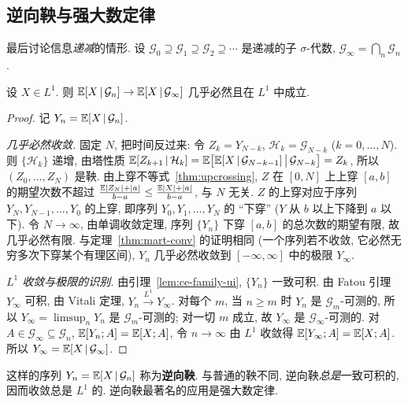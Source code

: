 \subsection{逆向鞅与强大数定律}

最后讨论信息\emph{递减}的情形. 设 $\mathcal{G}_0\supseteq\mathcal{G}_1\supseteq\mathcal{G}_2\supseteq\cdots$ 是递减的子 $\sigma$-代数, $\mathcal{G}_\infty=\bigcap_n\mathcal{G}_n$.

\begin{theorem}\label{thm:levy-down}
设 $X\in L^1$. 则 $\mathbb{E}[X\,|\,\mathcal{G}_n]\to\mathbb{E}[X\,|\,\mathcal{G}_\infty]$ 几乎必然且在 $L^1$ 中成立.
\end{theorem}

\begin{proof}
记 $Y_n=\mathbb{E}[X\,|\,\mathcal{G}_n]$.

\emph{几乎必然收敛.} 固定 $N$, 把时间反过来: 令 $Z_k=Y_{N-k}$, $\mathcal{H}_k=\mathcal{G}_{N-k}$ ($k=0,\dots,N$). 则 $\{\mathcal{H}_k\}$ 递增, 由塔性质 $\mathbb{E}[Z_{k+1}\,|\,\mathcal{H}_k]=\mathbb{E}\big[\mathbb{E}[X\,|\,\mathcal{G}_{N-k-1}]\,\big|\,\mathcal{G}_{N-k}\big]=Z_k$, 所以 $(Z_0,\dots,Z_N)$ 是鞅. 由上穿不等式~\ref{thm:upcrossing}, $Z$ 在 $[0,N]$ 上上穿 $[a,b]$ 的期望次数不超过 $\frac{\mathbb{E}\lvert Z_N\rvert+\lvert a\rvert}{b-a}\le\frac{\mathbb{E}\lvert X\rvert+\lvert a\rvert}{b-a}$, 与 $N$ 无关. $Z$ 的上穿对应于序列 $Y_N,Y_{N-1},\dots,Y_0$ 的上穿, 即序列 $Y_0,Y_1,\dots,Y_N$ 的 ``下穿'' ($Y$ 从 $b$ 以上下降到 $a$ 以下). 令 $N\to\infty$, 由单调收敛定理, 序列 $\{Y_n\}$ 下穿 $[a,b]$ 的总次数的期望有限, 故几乎必然有限. 与定理~\ref{thm:mart-conv} 的证明相同 (一个序列若不收敛, 它必然无穷多次下穿某个有理区间), $Y_n$ 几乎必然收敛到 $[-\infty,\infty]$ 中的极限 $Y_\infty$.

\emph{$L^1$ 收敛与极限的识别.} 由引理~\ref{lem:ce-family-ui}, $\{Y_n\}$ 一致可积. 由 Fatou 引理 $Y_\infty$ 可积, 由 Vitali 定理, $Y_n\xrightarrow{L^1}Y_\infty$. 对每个 $m$, 当 $n\ge m$ 时 $Y_n$ 是 $\mathcal{G}_m$-可测的, 所以 $Y_\infty=\limsup_nY_n$ 是 $\mathcal{G}_m$-可测的; 对一切 $m$ 成立, 故 $Y_\infty$ 是 $\mathcal{G}_\infty$-可测的. 对 $A\in\mathcal{G}_\infty\subseteq\mathcal{G}_n$, $\mathbb{E}[Y_n;A]=\mathbb{E}[X;A]$, 令 $n\to\infty$ 由 $L^1$ 收敛得 $\mathbb{E}[Y_\infty;A]=\mathbb{E}[X;A]$. 所以 $Y_\infty=\mathbb{E}[X\,|\,\mathcal{G}_\infty]$.
\end{proof}

这样的序列 $Y_n=\mathbb{E}[X\,|\,\mathcal{G}_n]$ 称为\textbf{逆向鞅}. 与普通的鞅不同, 逆向鞅\emph{总是}一致可积的, 因而收敛总是 $L^1$ 的. 逆向鞅最著名的应用是强大数定律.

